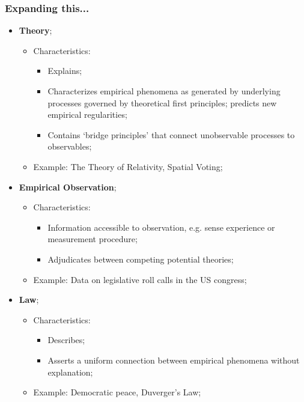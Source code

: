 \documentclass[aspectratio=169]{beamer}
\theoremstyle{principle}
\begin{document}
%

\begin{frame}
\frametitle{Expanding this...}
\begin{itemize}
\item \textbf{Theory};
\begin{itemize}
\item Characteristics: 
\begin{itemize}
\item Explains; 
\item Characterizes empirical phenomena as generated by underlying processes governed by theoretical first principles; predicts new empirical regularities;
\item Contains `bridge principles' that connect unobservable processes to observables;
\end{itemize}
\item Example: The Theory of Relativity, Spatial Voting;
\end{itemize}
\bigskip
\item \textbf{Empirical Observation};
\begin{itemize}
\item Characteristics: 
\begin{itemize}
\item Information accessible to observation, e.g. sense experience or measurement procedure;
\item Adjudicates between competing potential theories;
\end{itemize}
\item Example: Data on legislative roll calls in the US congress;
\end{itemize}
\bigskip
\item \textbf{Law};
\begin{itemize}
\item Characteristics: 
\begin{itemize}
\item Describes;
\item Asserts a uniform connection between empirical phenomena without explanation;
\end{itemize}
\item Example: Democratic peace, Duverger's Law;
\end{itemize}
\end{itemize}

\end{frame}
\end{document}
